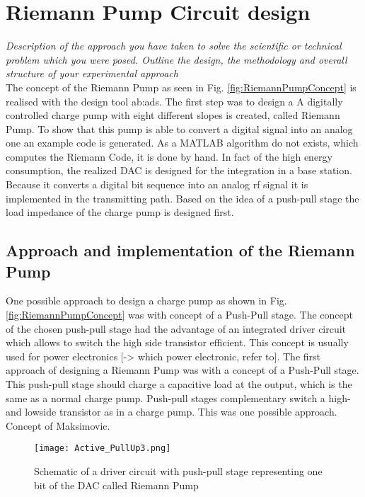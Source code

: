 \chapter{Riemann Pump Circuit design}
\label{ch:design}
\textit{Description of the approach you have taken to solve the scientific or technical problem which you were posed. Outline the design, the methodology and overall structure of your experimental approach}\\ 
The concept of the Riemann Pump as seen in Fig. \ref{fig:RiemannPumpConcept} is realised with the design tool \gls{ab:ads}.
The first step was to design a 
A digitally controlled charge pump with eight different slopes is created, called Riemann Pump. To show that this pump is able to convert a digital signal into an analog one an example code is generated. As a MATLAB algorithm do not exists, which computes the Riemann Code, it is done by hand.
In fact of the high energy consumption, the realized DAC is designed for the integration in a base station. Because it converts a digital bit sequence into an analog rf signal it is implemented in the transmitting path. Based on the idea of a push-pull stage the load impedance of the charge pump is designed first.
\section{Approach and implementation of the Riemann Pump}
One possible approach to design a charge pump as shown in Fig. \ref{fig:RiemannPumpConcept} was with concept of a Push-Pull stage.
The concept of the chosen push-pull stage had the advantage of an integrated driver circuit which allows to switch the high side transistor efficient.
This concept is usually used for power electronics [-> which power electronic, refer to].
The first approach of designing a Riemann Pump was with a concept of a Push-Pull stage. This push-pull stage should charge a capacitive load at the output, which is the same as a normal charge pump. Push-pull stages complementary switch a high- and lowside transistor as in a charge pump. This was one possible approach. Concept of Maksimovic.

\begin{figure}[ht]
	\centering
  \texttt{[image: Active\_PullUp3.png]}
	\caption{Schematic of a driver circuit with push-pull stage representing one bit of the DAC called Riemann Pump}
	\label{RiemannPump}
\end{figure}

 



